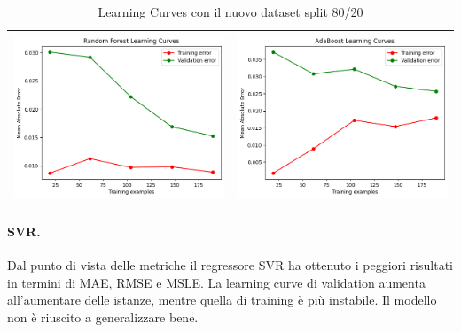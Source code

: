 \begin{table}[H]
\begin{tabularx}{\textwidth}{|X|X|}
        \includegraphics[width=\linewidth, trim=0 0 0 0]{images/RandomForest_lc80.png} &
        \includegraphics[width=\linewidth, trim=0 0 0 0]{images/AdaBoost_lc80.png} \\
        \hline
    \end{tabularx}
    \caption{Learning Curves con il nuovo dataset split 80/20}
    \label{tab:emissions_info}
\end{table}

\paragraph{\textbf{SVR}.}
Dal punto di vista delle metriche il regressore SVR ha ottenuto i peggiori risultati in termini di MAE, RMSE e MSLE. La learning curve di validation aumenta all'aumentare delle istanze, mentre quella di training è più instabile. Il modello non è riuscito a generalizzare bene.

